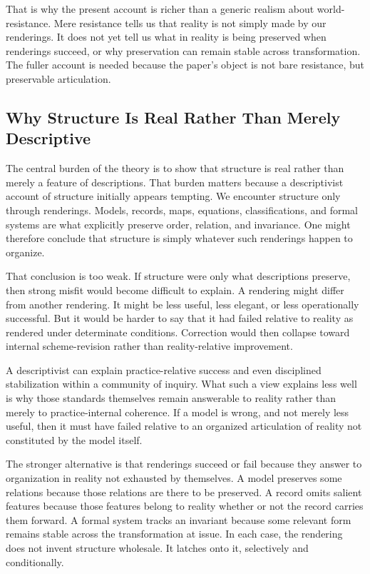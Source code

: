 \documentclass[11pt]{article}
\begin{document}
That is why the present account is richer than a generic realism about world-resistance. Mere resistance tells us that reality is not simply made by our renderings. It does not yet tell us what in reality is being preserved when renderings succeed, or why preservation can remain stable across transformation. The fuller account is needed because the paper's object is not bare resistance, but preservable articulation.

\subsection{Why Structure Is Real Rather Than Merely Descriptive}

The central burden of the theory is to show that structure is real rather than merely a feature of descriptions. That burden matters because a descriptivist account of structure initially appears tempting. We encounter structure only through renderings. Models, records, maps, equations, classifications, and formal systems are what explicitly preserve order, relation, and invariance. One might therefore conclude that structure is simply whatever such renderings happen to organize.

That conclusion is too weak. If structure were only what descriptions preserve, then strong misfit would become difficult to explain. A rendering might differ from another rendering. It might be less useful, less elegant, or less operationally successful. But it would be harder to say that it had failed relative to reality as rendered under determinate conditions. Correction would then collapse toward internal scheme-revision rather than reality-relative improvement. \cite{FriggNguyen2021ScientificRepresentationSEP}

A descriptivist can explain practice-relative success and even disciplined stabilization within a community of inquiry. What such a view explains less well is why those standards themselves remain answerable to reality rather than merely to practice-internal coherence. If a model is wrong, and not merely less useful, then it must have failed relative to an organized articulation of reality not constituted by the model itself.

The stronger alternative is that renderings succeed or fail because they answer to organization in reality not exhausted by themselves. A model preserves some relations because those relations are there to be preserved. A record omits salient features because those features belong to reality whether or not the record carries them forward. A formal system tracks an invariant because some relevant form remains stable across the transformation at issue. In each case, the rendering does not invent structure wholesale. It latches onto it, selectively and conditionally.
\end{document}
